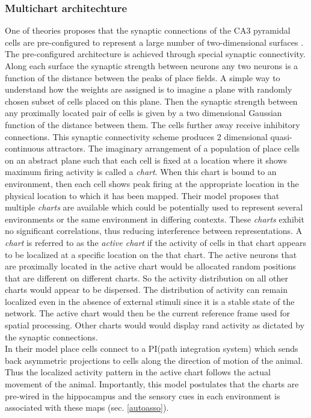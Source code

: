 \subsubsection{Multichart architechture}
\label{pathIntegration}
One of theories proposes that the synaptic connections of the CA3 pyramidal cells are pre-configured to represent a large number of two-dimensional surfaces \cite{Samsonovich1997}. The pre-configured architecture is achieved through special synaptic connectivity. Along each surface the synaptic strength between neurons any two neurons is a function of the distance between the peaks of place fields.  %
A simple way to understand how the weights are assigned is to imagine a plane with randomly chosen subset of cells placed on this plane. Then the synaptic strength between any proximally located pair of cells is given by a two dimensional Gaussian function of the distance between them. The cells further away receive inhibitory connections. This synaptic connectivity scheme produces 2 dimensional quasi-continuous attractors. The imaginary arrangement of a population of place cells on an abstract plane such that each  cell is fixed at a location where it shows maximum firing activity is called a \emph{chart}. When this chart is bound to an environment, then each cell shows peak firing at the appropriate location in the physical location to which it has been mapped. Their model proposes that multiple \emph{charts} are available which could be potentially used to represent several environments or the same environment in differing contexts. These \emph{charts} exhibit no significant correlations, thus reducing  interference between representations. A \emph{chart} is referred to as the \emph{active chart} if the activity of cells in that chart appears to be localized at a specific location on the that chart. The active neurons that are proximally located in the active chart would be allocated random positions that are different on different charts. So the activity distribution on all other charts would appear to be dispersed. The distribution of activity can remain localized even in the absence of external stimuli since it is a stable state of the network. The active chart would then be the current reference frame used for spatial processing. Other charts would would display rand activity as dictated by the synaptic connections. \\
In their model place cells connect to a PI(path integration system) which sends back asymmetric projections to cells along the direction of motion of the animal. Thus the localized activity pattern in the active chart follows the actual movement of the animal. Importantly, this model postulates that the charts are pre-wired in the hippocampus and the sensory cues in each environment is associated with these maps (sec. \ref{autoasso}).

